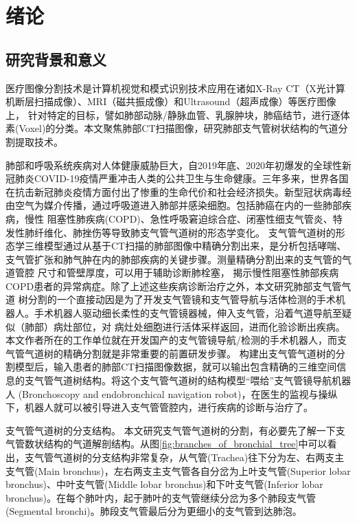 
\chapter{绪论}

\section{研究背景和意义}

医疗图像分割技术是计算机视觉和模式识别技术应用在诸如X-Ray CT（X光计算机断层扫描成像）、MRI（磁共振成像）和Ultrasound（超声成像）等医疗图像上，
针对特定的目标，譬如肺部动脉/静脉血管、乳腺肿块，肺癌结节，进行逐体素(Voxel)的分类。本文聚焦肺部CT扫描图像，研究肺部支气管树状结构的气道分割提取技术。


肺部和呼吸系统疾病对人体健康威胁巨大，自2019年底、2020年初爆发的全球性新冠肺炎COVID-19疫情严重冲击人类的公共卫生与生命健康。三年多来，世界各国在抗击新冠肺炎疫情方面付出了惨重的生命代价和社会经济损失。新型冠状病毒经由空气为媒介传播，通过呼吸道进入肺部并感染细胞。包括肺癌在内的一些肺部疾病，慢性
阻塞性肺疾病(COPD)\cite{fetita2004pulmonary}、急性呼吸窘迫综合症\cite{howling1998significance}、闭塞性细支气管炎\cite{shaw2002role}、特发性肺纤维化\cite{wu2019computed}、肺挫伤\cite{li2019application}等导致肺支气管气道树的形态学变化。
支气管气道树的形态学三维模型通过从基于CT扫描的肺部图像中精确分割出来，是分析包括哮喘、支气管扩张和肺气肿在内的肺部疾病的关键步骤。测量精确分割出来的支气管的气道管腔
尺寸和管壁厚度，可以用于辅助诊断肺栓塞\cite{estepar2013computed}， 揭示慢性阻塞性肺部疾病COPD患者的异常病症。除了上述这些疾病诊断治疗之外，本文研究肺部支气管气道
树分割的一个直接动因是为了开发支气管镜和支气管导航与活体检测的手术机器人。手术机器人驱动细长柔性的支气管镜器械，伸入支气管，沿着气道导航至疑似（肺部）病灶部位，对
病灶处细胞进行活体采样返回，进而化验诊断出疾病。本文作者所在的工作单位就在开发国产的支气管镜导航/检测的手术机器人，而支气管气道树的精确分割就是非常重要的前置研发步骤。
构建出支气管气道树的分割模型后，输入患者的肺部CT扫描图像数据，就可以输出包含精确的三维空间信息的支气管气道树结构。将这个支气管气道树的结构模型“喂给”支气管镜导航机器人
(Bronchoscopy and endobronchical navigation robot)，在医生的监视与操纵下，机器人就可以被引导进入支气管管腔内，进行疾病的诊断与治疗了。

{\heiti 支气管气道树的分支结构。} 本文研究支气管气道树的分割，有必要先了解一下支气管数状结构的气道解剖结构。从图\ref{fig:branches_of_bronchial_tree}中可以看出，支气管气道树的分支结构非常复杂，从气管(Trachea)往下分为左、右两支主支气管(Main bronchus)，左右两支主支气管各自分岔为上叶支气管(Superior lobar bronchus)、中叶支气管(Middle lobar bronchus)和下叶支气管(Inferior
 lobar bronchus)。在每个肺叶内，起于肺叶的支气管继续分岔为多个肺段支气管(Segmental bronchi)。肺段支气管最后分为更细小的支气管到达肺泡。

